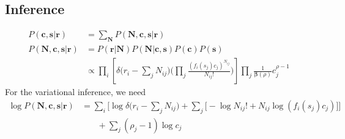 \documentclass[12pt]{article}
\begin{document}
\subsection{Inference}
\begin{equation}
\begin{aligned}
P(\mathbf{c, s|r}) & = \sum_\mathbf{N} P(\mathbf{N, c, s|r}) \\
P(\mathbf{N, c, s|r}) 
& =  P(\mathbf{r|N}) P(\mathbf{N|c, s}) P(\mathbf{c}) P(\mathbf{s})\\
&\propto \prod_i \left[\delta \Big( r_i - \sum_j N_{ij} \Big) \bigg( \prod_j\frac{(f_i(s_j)c_j)^{N_{ij}}}{N_{ij}!} \bigg) \right] \prod_j \frac{1}{\mathbf{\beta}(\rho)} c_j^{\rho - 1} 
\end{aligned}
\end{equation}
For the variational inference, we need\\
 \begin{equation}
\begin{aligned}
\log P(\mathbf{N, c, s| r}) &= \sum_i \Big[ \log\delta \Big( r_i - \sum_j N_{ij} \Big) + \sum_j \big[-\log N_{ij}! + N_{ij} \log(f_i(s_j)c_j)\big] \Big]\\
& \phantom{{}=1} + \sum_j (\rho_j - 1)\log c_j
\end{aligned}
\end{equation}
\end{document}
